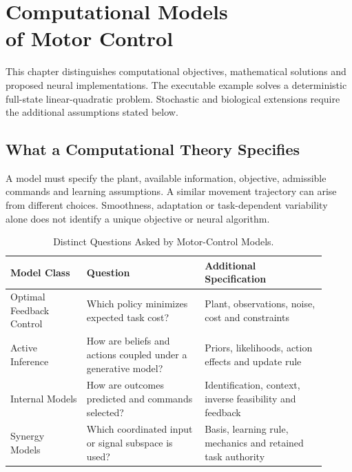 \chapter[Computational Models of Motor Control]{Computational Models\\of Motor Control}
\label{ch:computational}

\begin{gomdraftnotice}
This chapter distinguishes computational objectives, mathematical solutions
and proposed neural implementations. The executable example solves a
deterministic full-state linear-quadratic problem. Stochastic and biological
extensions require the additional assumptions stated below.
\end{gomdraftnotice}

\section{What a Computational Theory Specifies}

A model must specify the plant, available information, objective, admissible
commands and learning assumptions. A similar movement trajectory can arise
from different choices. Smoothness, adaptation or task-dependent variability
alone does not identify a unique objective or neural algorithm.

\begin{table}[htbp]
\centering
\caption{Distinct Questions Asked by Motor-Control Models.}
\label{tab:ch10:theories}
\begin{tabular}{@{}p{0.22\linewidth}p{0.34\linewidth}p{0.35\linewidth}@{}}
\toprule
\textbf{Model Class}&\textbf{Question}&\textbf{Additional Specification}\\
\midrule
Optimal Feedback Control&Which policy minimizes expected task cost?&
Plant, observations, noise, cost and constraints\\
Active Inference&How are beliefs and actions coupled under a generative model?&
Priors, likelihoods, action effects and update rule\\
Internal Models&How are outcomes predicted and commands selected?&
Identification, context, inverse feasibility and feedback\\
Synergy Models&Which coordinated input or signal subspace is used?&
Basis, learning rule, mechanics and retained task authority\\
\bottomrule
\end{tabular}
\end{table}

